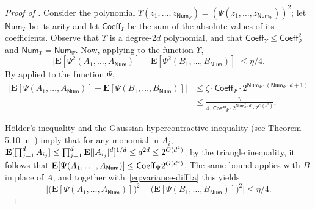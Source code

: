 \documentclass{toc}
\newcommand{\E}{{\bf E}}
\begin{document}
\begin{proof}[Proof of ]
    Consider the polynomial $\Upsilon(z_1, \ldots, z_{\mathsf{Num}_\Psi}) =
    (\Psi(z_1, \ldots, z_{\mathsf{Num}_\Psi}))^2$; let $\mathsf{Num}_\Upsilon$
be its arity and let
$\mathsf{Coeff}_\Upsilon$ be the sum of the absolute values of its
coefficients. Observe that $\Upsilon$ is a degree-$2d$ polynomial, and that
$\mathsf{Coeff}_{\Upsilon} \le \mathsf{Coeff}^2_{\Psi}$ and
$\mathsf{Num}_\Upsilon  = \mathsf{Num}_\Psi$. Now, applying
 to the function $\Upsilon$, %
\begin{equation}\label{eq:variance-diff1}
\big|\mathbf{E} [ \Psi^2(A_1, \ldots, A_{\mathsf{Num}})] -  \mathbf{E} [ \Psi^2(B_1, \ldots, B_{\mathsf{Num}})]  \big| \le \eta/4. 
\end{equation}
By  applied to the function $\Psi$,
\begin{equation}\label{eq:variance-diff1a}
  \begin{split}
  \big|\mathbf{E} [ \Psi(A_1, \ldots, A_{\mathsf{Num}})] -  \mathbf{E} [ \Psi(B_1, \ldots, B_{\mathsf{Num}})]  \big| &\le \zeta \cdot \mathsf{Coeff}_\Psi \cdot 2^{\mathsf{Num}_\Psi \cdot (\mathsf{Num}_\Psi \cdot d+1)}\\ &\le \frac{\eta}{4 \cdot \mathsf{Coeff}_\Psi \cdot 2^{\mathsf{Num}_\Psi^2 \cdot d} \cdot 2^{O(d^3)}}.
\end{split}
\end{equation}

H\"older's inequality and the Gaussian hypercontractive inequality (see Theorem 5.10 in~\cite{Janson:97}) imply that
for any monomial in $A_i$,
$\E [\prod_{j=1}^d A_{i_j}] \le \prod_{j=1}^d \E[|A_{i_j}|^d]^{1/d} \le d^{2d} \le 2^{O(d^2)}$;
by the triangle inequality, it follows that $\E[\Psi(A_1, \dots, A_{\mathsf{Num}})] \le \mathsf{Coeff}_\Psi 2^{O(d^3)}$. The same bound applies with $B$ in place of $A$, and together
with~\eqref{eq:variance-diff1a} this yields
\begin{equation}\label{eq:variance-diff2}
\big|\big(\mathbf{E} [ \Psi(A_1, \ldots, A_{\mathsf{Num}})]\big)^2- \big(\mathbf{E} [ \Psi(B_1, \ldots, B_{\mathsf{Num}})]\big)^2 \big| \le \eta/4. 
\end{equation}


\end{proof}
\end{document}
